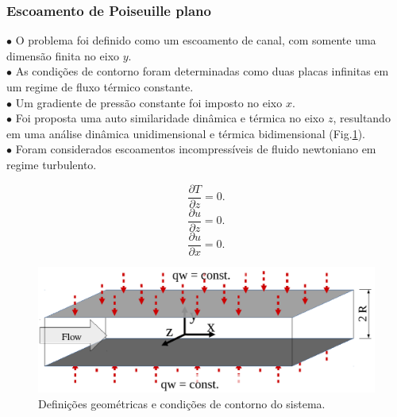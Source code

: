 \documentclass[xcolor=dvipsnames,10pt,aspectratio=169]{beamer}
\begin{document}
	
	
	
	
		\begin{frame}
			\frametitle{Escoamento de Poiseuille plano}
			$\bullet$ O problema foi definido como um escoamento de canal, com somente uma dimensão finita no eixo $y$. \\
			$\bullet$ As condições de contorno foram determinadas como duas placas infinitas em um regime de fluxo térmico constante.\\
			$\bullet$ Um gradiente de pressão constante foi imposto no eixo $x$.\\
			$\bullet$ Foi proposta uma auto similaridade dinâmica e térmica no eixo $z$, resultando em uma análise dinâmica unidimensional e térmica bidimensional (Fig.\ref{figure.1}). \\
			$\bullet$ Foram considerados escoamentos incompressíveis de fluido newtoniano em regime turbulento.\\
			\begin{minipage}[h!]{0.3\textwidth}
				\begin{equation*}
				 \frac{\partial T }{\partial z} = 0.
				\end{equation*}
				\begin{equation*}
				\frac{\partial u }{\partial z} = 0.
				\end{equation*}
				\begin{equation*}
				\frac{\partial u }{\partial x} = 0.
				\end{equation*}
			\end{minipage}
			\begin{minipage}[h!]{0.5\textwidth}
			\begin{figure}[h!]
				\centering
				\includegraphics[angle=0, scale=0.30]{figure1}
				\caption{Definições geométricas e condições de contorno do sistema.}
				\label{figure.1}
			\end{figure}
			\end{minipage}
			\\
		\end{frame}
	
\end{document}
